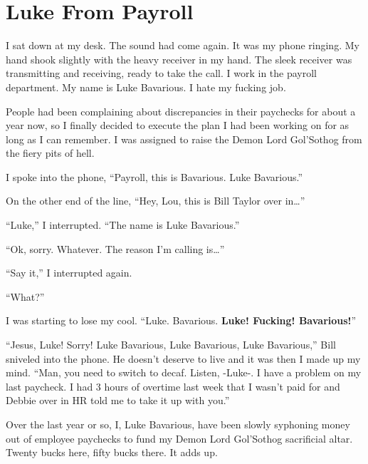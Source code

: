 \chapter{Luke From Payroll}


I sat down at my desk. The sound had come again. It was my phone
ringing. My hand shook slightly with the heavy receiver in my hand.
The sleek receiver was transmitting and receiving, ready to take
the call. I work in the payroll department. My name is Luke
Bavarious. I hate my fucking job.



People had been complaining about discrepancies in their paychecks
for about a year now, so I finally decided to execute the plan I
had been working on for as long as I can remember. I was assigned
to raise the Demon Lord Gol'Sothog from the fiery pits of
hell.



I spoke into the phone, ``Payroll, this is Bavarious. Luke
Bavarious.''



On the other end of the line, ``Hey, Lou, this is Bill Taylor over
in{\ldots}''



``Luke,'' I interrupted. ``The name is Luke Bavarious.''



``Ok, sorry. Whatever. The reason I'm calling is{\ldots}''



``Say it,'' I interrupted again.



``What?''



I was starting to lose my cool. ``Luke. Bavarious. {\bf Luke! Fucking!
Bavarious!}''



``Jesus, Luke! Sorry! Luke Bavarious, Luke Bavarious, Luke
Bavarious,'' Bill sniveled into the phone. He doesn't deserve to
live and it was then I made up my mind. ``Man, you need to switch to
decaf. Listen, -Luke-. I have a problem on my last paycheck. I had
3 hours of overtime last week that I wasn't paid for and Debbie
over in HR told me to take it up with you.''



Over the last year or so, I, Luke Bavarious, have been slowly
syphoning money out of employee paychecks to fund my Demon Lord
Gol'Sothog sacrificial altar. Twenty bucks here, fifty bucks there.
It adds up.



